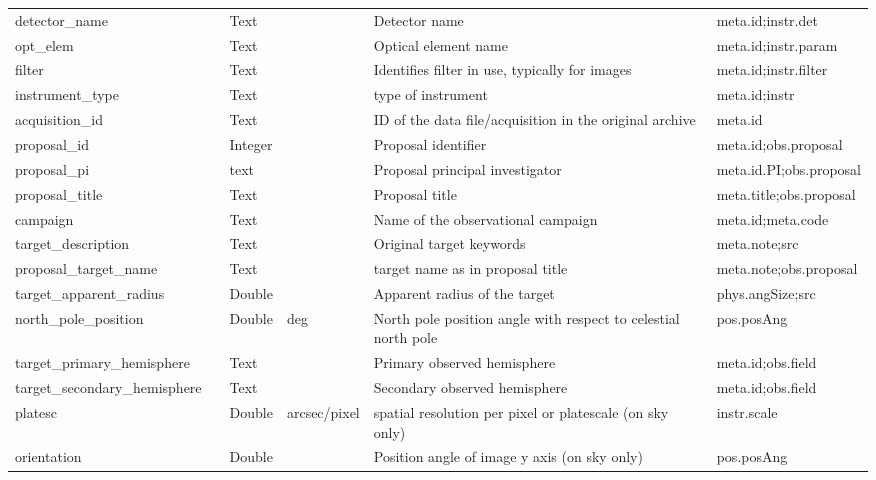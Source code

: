 \documentclass[11pt,a4paper]{ivoa}
\begin{document}
\begin{longtable}{p{3.5cm}p{0.5cm}p{1cm}p{1cm}p{7cm}p{3cm}}
detector\_name&&Text&&Detector name&meta.id;instr.det\\

opt\_elem&&Text&&Optical element name&meta.id;instr.param\\

filter&&Text& &Identifies filter in use, typically for images&meta.id;instr.filter\\

instrument\_type&&Text&&type of instrument&meta.id;instr\\

acquisition\_id&&Text&&ID of the data file/acquisition in the original archive&meta.id\\

proposal\_id&&Integer&&Proposal identifier&meta.id;obs.proposal\\

proposal\_pi&&text&&Proposal principal investigator&meta.id.PI;obs.proposal\\

proposal\_title&&Text&&Proposal title&meta.title;obs.proposal\\

campaign&&Text&&Name of the observational campaign&meta.id;meta.code\\

target\_description&&Text&&Original target keywords&meta.note;src\\

proposal\_target\_name&&Text&&target name as in proposal title&meta.note;obs.proposal\\

target\_apparent\_radius&&Double&&Apparent radius of the target&phys.angSize;src\\

north\_pole\_position&&Double&deg&North pole position angle with respect to celestial north pole&pos.posAng\\

target\_primary\_hemisphere&&Text&&Primary observed hemisphere&meta.id;obs.field\\

target\_secondary\_hemisphere&&Text&&Secondary observed hemisphere&meta.id;obs.field\\

platesc&&Double&arcsec/pixel&spatial resolution per pixel or platescale (on sky only)&instr.scale\\

orientation&&Double&&Position angle of image y axis (on sky only)&pos.posAng\\


\end{longtable}
\end{document}
